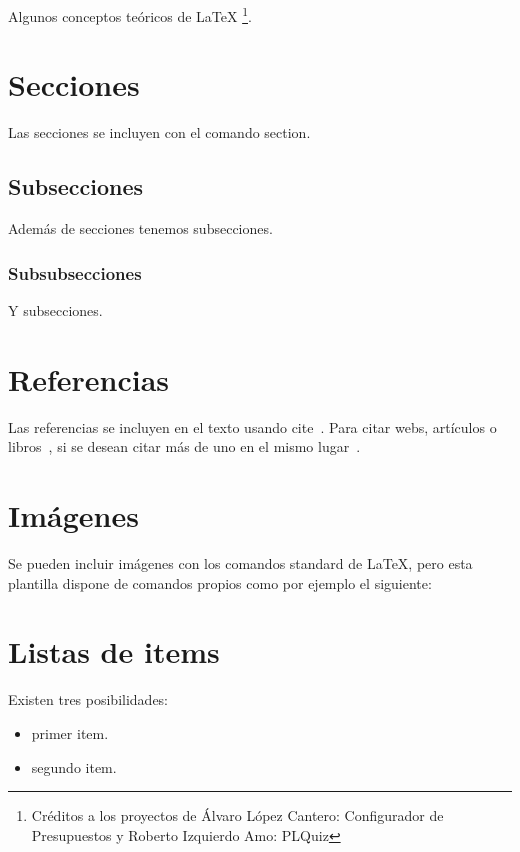 Algunos conceptos teóricos de \LaTeX{} \footnote{Créditos a los proyectos de Álvaro López Cantero: Configurador de Presupuestos y Roberto Izquierdo Amo: PLQuiz}.

\section{Secciones}

Las secciones se incluyen con el comando section.

\subsection{Subsecciones}

Además de secciones tenemos subsecciones.

\subsubsection{Subsubsecciones}

Y subsecciones. 


\section{Referencias}

Las referencias se incluyen en el texto usando cite~\cite{wiki:latex}. Para citar webs, artículos o libros~\cite{koza92}, si se desean citar más de uno en el mismo lugar~\cite{bortolot2005, koza92}.


\section{Imágenes}

Se pueden incluir imágenes con los comandos standard de \LaTeX, pero esta plantilla dispone de comandos propios como por ejemplo el siguiente:




\section{Listas de items}

Existen tres posibilidades:

\begin{itemize}
	\item primer item.
	\item segundo item.
\end{itemize}


